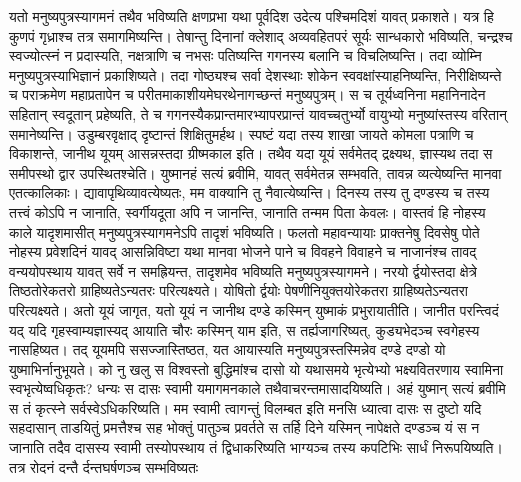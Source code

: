 \vakya यतो मनुष्यपुत्रस्यागमनं तथैव भविष्यति क्षणप्रभा यथा पूर्वदिश उदेत्य पश्चिमदिशं यावत् प्रकाशते।
\vakya यत्र हि कुणपं गृध्राश्च तत्र समागमिष्यन्ति।
\vakya तेषान्तु दिनानां क्लेशाद् अव्यवहितपरं सूर्यः सान्धकारो भविष्यति, चन्द्रश्च स्वज्योत्स्नं न प्रदास्यति, नक्षत्राणि च नभसः पतिष्यन्ति गगनस्य बलानि च विचलिष्यन्ति।
\vakya तदा व्योम्नि मनुष्यपुत्रस्याभिज्ञानं प्रकाशिष्यते। तदा गोष्ठ्यश्च सर्वा देशस्थाः शोकेन स्ववक्षांस्याहनिष्यन्ति, निरीक्षिष्यन्ते च पराक्रमेण महाप्रतापेन च परीतमाकाशीयमेघरथेनागच्छन्तं मनुष्यपुत्रम्।
\vakya स च तूर्यध्वनिना महानिनादेन सहितान् स्वदूतान् प्रहेष्यति, ते च गगनस्यैकप्रान्तमारभ्यापरप्रान्तं यावच्चतुर्भ्यो वायुभ्यो मनुष्यांस्तस्य वरितान् समानेष्यन्ति।
\vakya उडुम्बरवृक्षाद् दृष्टान्तं शिक्षितुमर्हथ। स्पष्टं यदा तस्य शाखा जायते कोमला पत्राणि च विकाशन्ते, जानीथ यूयम् आसन्नस्तदा ग्रीष्मकाल इति।
\vakya तथैव यदा यूयं सर्वमेतद् द्रक्ष्यथ, ज्ञास्यथ तदा स समीपस्थो द्वार उपस्थितश्चेति।
\vakya युष्मानहं सत्यं ब्रवीमि, यावत् सर्वमेतन्न सम्भवति, तावन्न व्यत्येष्यन्ति मानवा एतत्कालिकाः।
\vakya द्यावापृथिव्यावत्येष्यतः, मम वाक्यानि तु नैवात्येष्यन्ति।
\vakya दिनस्य तस्य तु दण्डस्य च तस्य तत्त्वं कोऽपि न जानाति, स्वर्गीयदूता अपि न जानन्ति, जानाति तन्मम पिता केवलः।
\vakya वास्तवं हि नोहस्य काले यादृशमासीत् मनुष्यपुत्रस्यागमनेऽपि तादृशं भविष्यति।
\vakya फलतो महावन्यायाः प्राक्तनेषु दिवसेषु पोते नोहस्य प्रवेशदिनं यावद् आसन्निविष्टा यथा मानवा भोजने पाने च विवहने विवाहने च नाजानंश्च
\vakya तावद् वन्ययोपस्थाय यावत् सर्वे न समह्रियन्त, तादृशमेव भविष्यति मनुष्यपुत्रस्यागमने। 
\vakya नरयो र्द्वयोस्तदा क्षेत्रे तिष्ठतोरेकतरो ग्राहिष्यतेऽन्यतरः परित्यक्ष्यते।
\vakya योषितो र्द्वयोः पेषणीनियुक्तयोरेकतरा ग्राहिष्यतेऽन्यतरा परित्यक्ष्यते।
\vakya अतो यूयं जागृत, यतो यूयं न जानीथ दण्डे कस्मिन् युष्माकं प्रभुरायातीति।
\vakya जानीत परन्त्विदं यद् यदि गृहस्वाम्यज्ञास्यद् आयाति चौरः कस्मिन् याम इति, स तर्ह्यजागरिष्यत्, कुड्यभेदञ्च स्वगेहस्य नासहिष्यत।
\vakya तद् यूयमपि ससज्जास्तिष्ठत, यत आयास्यति मनुष्यपुत्रस्तस्मिन्नेव दण्डे दण्डो यो युष्माभिर्नानुभूयते।
\vakya को नु खलु स विश्वस्तो बुद्धिमांश्च दासो यो यथासमये भृत्येभ्यो भक्ष्यवितरणाय स्वामिना स्वभृत्येष्वधिकृतः?
\vakya धन्यः स दासः स्वामी यमागमनकाले तथैवाचरन्तमासादयिष्यति।
\vakya अहं युष्मान् सत्यं ब्रवीमि स तं कृत्स्ने सर्वस्वेऽधिकरिष्यति।
\vakya मम स्वामी त्वागन्तुं विलम्बत इति मनसि ध्यात्वा दासः स दुष्टो
\vakya यदि सहदासान् ताडयितुं प्रमत्तैश्च सह भोक्तुं पातुञ्च प्रवर्तते
\vakya स तर्हि दिने यस्मिन् नापेक्षते दण्डञ्च यं स न जानाति तदैव दासस्य स्वामी तस्योपस्थाय
\vakya तं द्विधाकरिष्यति भाग्यञ्च तस्य कपटिभिः सार्धं निरूपयिष्यति। तत्र रोदनं दन्तै र्दन्तघर्षणञ्च सम्भविष्यतः\eoc